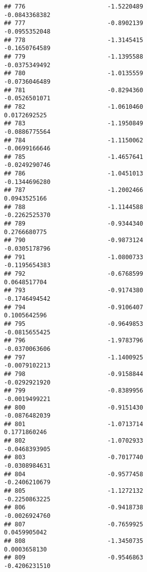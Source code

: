 \documentclass[
]{article}
\begin{document}
\begin{verbatim}
## 776                       -1.5220489                         -0.0843368382
## 777                       -0.8902139                         -0.0955352048
## 778                       -1.3145415                         -0.1650764589
## 779                       -1.1395588                         -0.0375349492
## 780                       -1.0135559                         -0.0736046489
## 781                       -0.8294360                         -0.0526501071
## 782                       -1.0610460                          0.0172692525
## 783                       -1.1950849                         -0.0886775564
## 784                       -1.1150062                         -0.0699166646
## 785                       -1.4657641                         -0.0249290746
## 786                       -1.0451013                         -0.1344696280
## 787                       -1.2002466                          0.0943525166
## 788                       -1.1144588                         -0.2262525370
## 789                       -0.9344340                          0.2766680775
## 790                       -0.9873124                         -0.0305178796
## 791                       -1.0800733                         -0.1195654383
## 792                       -0.6768599                          0.0648517704
## 793                       -0.9174380                         -0.1746494542
## 794                       -0.9106407                          0.1005642596
## 795                       -0.9649853                         -0.0815655425
## 796                       -1.9783796                         -0.0370063606
## 797                       -1.1400925                         -0.0079102213
## 798                       -0.9158844                         -0.0292921920
## 799                       -0.8389956                         -0.0019499221
## 800                       -0.9151430                         -0.0876482039
## 801                       -1.0713714                          0.1771860246
## 802                       -1.0702933                         -0.0468393905
## 803                       -0.7017740                         -0.0308984631
## 804                       -0.9577458                         -0.2406210679
## 805                       -1.1272132                         -0.2250863225
## 806                       -0.9418738                         -0.0026924760
## 807                       -0.7659925                          0.0459905042
## 808                       -1.3450735                          0.0003658130
## 809                       -0.9546863                         -0.4206231510

\end{verbatim}
\end{document}
